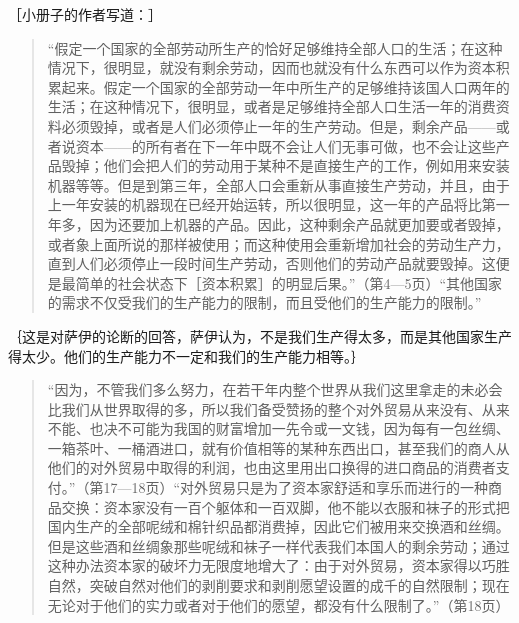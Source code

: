 ［小册子的作者写道：］

\begin{quote}{“假定一个国家的全部劳动所生产的恰好足够维持全部人口的生活；在这种情况下，很明显，就没有剩余劳动，因而也就没有什么东西可以作为资本积累起来。假定一个国家的全部劳动一年中所生产的足够维持该国人口两年的生活；在这种情况下，很明显，或者是足够维持全部人口生活一年的消费资料必须毁掉，或者是人们必须停止一年的生产劳动。但是，剩余产品——或者说资本——的所有者在下一年中既不会让人们无事可做，也不会让这些产品毁掉；他们会把人们的劳动用于某种不是直接生产的工作，例如用来安装机器等等。但是到第三年，全部人口会重新从事直接生产劳动，并且，由于上一年安装的机器现在已经开始运转，所以很明显，这一年的产品将比第一年多，因为还要加上机器的产品。因此，这种剩余产品就更加要或者毁掉，或者象上面所说的那样被使用；而这种使用会重新增加社会的劳动生产力，直到人们必须停止一段时间生产劳动，否则他们的劳动产品就要毁掉。这便是最简单的社会状态下［资本积累］的明显后果。”（第4—5页）“其他国家的需求不仅受我们的生产能力的限制，而且受他们的生产能力的限制。”}\end{quote}

｛这是对萨伊的论断的回答，萨伊认为，不是我们生产得太多，而是其他国家生产得太少。他们的生产能力不一定和我们的生产能力相等。｝

\begin{quote}{“因为，不管我们多么努力，在若干年内整个世界从我们这里拿走的未必会比我们从世界取得的多，所以我们备受赞扬的整个对外贸易从来没有、从来不能、也决不可能为我国的财富增加一先令或一文钱，因为每有一包丝绸、一箱茶叶、一桶酒进口，就有价值相等的某种东西出口，甚至我们的商人从他们的对外贸易中取得的利润，也由这里用出口换得的进口商品的消费者支付。”（第17—18页）“对外贸易只是为了资本家舒适和享乐而进行的一种商品交换：资本家没有一百个躯体和一百双脚，他不能以衣服和袜子的形式把国内生产的全部呢绒和棉针织品都消费掉，因此它们被用来交换酒和丝绸。但是这些酒和丝绸象那些呢绒和袜子一样代表我们本国人的剩余劳动；通过这种办法资本家的破坏力无限度地增大了：由于对外贸易，资本家得以巧胜自然，突破自然对他们的剥削要求和剥削愿望设置的成千的自然限制；现在无论对于他们的实力或者对于他们的愿望，都没有什么限制了。”（第18页）}\end{quote}

